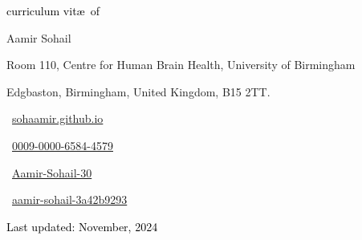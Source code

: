 \begin{scriptsize}
	 \textcolor{black}{curriculum vit\ae~of}
\end{scriptsize}

\begin{Large} 
	Aamir Sohail
\end{Large}

\vspace*{0.4em}
\begin{scshape}
	\begin{scriptsize}
		  \textcolor{highlight2}{Room 110, Centre for Human Brain Health, University of Birmingham}
		  
		  \vspace*{-1ex}
		  \textcolor{highlight2}{Edgbaston,
		  	Birmingham, United Kingdom, B15 2TT.}
	\end{scriptsize}
\end{scshape}
\vspace*{0.25cm}

\begin{footnotesize}
	\begin{tiny}\faHome\end{tiny}~\href{https://sohaamir.github.io}
	{sohaamir.github.io
	}
	\quad {} 
	
	
	\begin{tiny}\aiOrcid\end{tiny}~\href{https://orcid.org/my-orcid?emailVerified=true&orcid=0009-0000-6584-4579}{0009-0000-6584-4579}
	\quad 
	\begin{tiny}\aiResearchGate\end{tiny}~\href{https://www.researchgate.net/profile/Aamir-Sohail-30}{Aamir-Sohail-30}
		\quad
	\begin{tiny}\faLinkedin\end{tiny}~\href{https://www.linkedin.com/in/aamir-sohail-3a42b9293}{aamir-sohail-3a42b9293}
	

\end{footnotesize}

\vspace*{0cm}
\begin{center}
\textcolor{black}{\small{Last updated: November, 2024}}
\end{center}